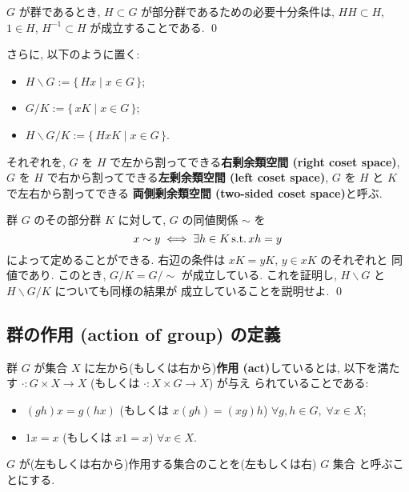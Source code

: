 \documentclass[12pt,twoside]{jarticle}
\def\suchthat{\mathop{\text{\rm s.t.}}}
\begin{document}
\begin{question}
  $G$ が群であるとき,  $H\subset G$ が部分群であるための必要十分条件は, 
  $HH\subset H$, $1\in H$, $H^{-1}\subset H$ が成立することである.
  \qed
\end{question}

さらに, 以下のように置く:
\begin{itemize}
\item $H\backslash G := \{\, Hx \mid x\in G \,\}$;
\item $G/K           := \{\, xK \mid x\in G \,\}$;
\item $H\backslash G/K := \{\, HxK \mid x\in G \,\}$.
\end{itemize}
それぞれを,
$G$ を $H$ で左から割ってできる{\bf 右剰余類空間 (right coset space)},
$G$ を $H$ で右から割ってできる{\bf 左剰余類空間 (left coset space)},
$G$ を $H$ と $K$ で左右から割ってできる
{\bf 両側剰余類空間 (two-sided coset space)}と呼ぶ. 

\begin{question}
  群 $G$ のその部分群 $K$ に対して, $G$ の同値関係 $\sim$ を %
  \begin{equation*}
    x\sim y \iff \exists h\in K \suchthat xh = y
  \end{equation*}
  によって定めることができる. 右辺の条件は $xK = yK$, $y\in xK$ のそれぞれと
  同値であり. このとき, $G/K = G/{\sim}$ が成立している. 
  これを証明し, $H\backslash G$ と $H\backslash G/K$ についても同様の結果が
  成立していることを説明せよ. \qed 
\end{question}


\subsection{群の作用 (action of group) の定義}
\label{ss:def-action}

群 $G$ が集合 $X$ に左から(もしくは右から){\bf 作用 (act)}しているとは, 
以下を満たす $\cdot:G\times X\to X$ (もしくは $\cdot:X\times G\to X$) が与え
られていることである:
\begin{itemize}
\item $(gh)x=g(hx)$ (もしくは $x(gh) = (xg)h$) \quad
  $\forall g,h\in G,\; \forall x\in X$;
\item $1x = x$ (もしくは $x1 = x$) \quad
  $\forall x\in X$.
\end{itemize}
$G$ が(左もしくは右から)作用する集合のことを(左もしくは右) $G$ 集合
と呼ぶことにする.
\end{document}
